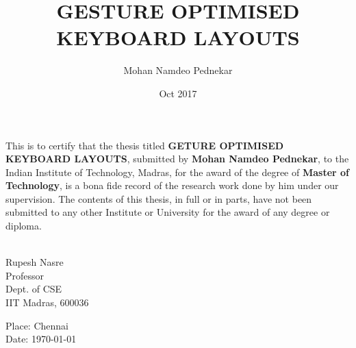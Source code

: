 \documentclass[MTech]{iitmdiss}
\begin{document}

\title{GESTURE OPTIMISED KEYBOARD LAYOUTS}

\author{Mohan Namdeo Pednekar}

\date{Oct 2017}

\maketitle
\certificate

\vspace*{0.5in}

\noindent This is to certify that the thesis titled {\bf GETURE OPTIMISED KEYBOARD LAYOUTS}, submitted by {\bf Mohan Namdeo Pednekar}, 
  to the Indian Institute of Technology, Madras, for
the award of the degree of {\bf Master of Technology}, is a bona fide
record of the research work done by him under our supervision.  The
contents of this thesis, in full or in parts, have not been submitted
to any other Institute or University for the award of any degree or
diploma.

\vspace*{1.5in}

\begin{singlespacing}
\hspace*{-0.25in}
\parbox{2.5in}{
 \\
\noindent Rupesh Nasre \\ 
\noindent Professor \\
\noindent Dept. of CSE\\
\noindent IIT Madras, 600036
} 
\hspace*{1.0in} 
\end{singlespacing}
\vspace*{0.25in}
\noindent Place: Chennai\\
Date: \today 

\acknowledgements
\end{document}
